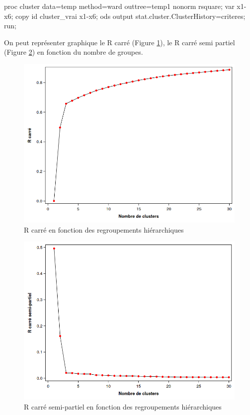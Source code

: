 \documentclass[
  11pt,
  letterpaper,
]{book}
\newenvironment{Shaded}{\begin{snugshade}}{\end{snugshade}}
\newcommand{\NormalTok}[1]{#1}
\theoremstyle{definition}
\theoremstyle{definition}
\theoremstyle{definition}
\theoremstyle{definition}
\theoremstyle{remark}
\begin{document}
\begin{Shaded}
\begin{Highlighting}[]
\NormalTok{proc cluster data=temp method=ward outtree=temp1 nonorm rsquare;}
\NormalTok{var x1{-}x6;}
\NormalTok{copy id cluster\_vrai x1{-}x6;}
\NormalTok{ods output stat.cluster.ClusterHistory=criteres;}
\NormalTok{run;}
\end{Highlighting}
\end{Shaded}

On peut représenter graphique le R carré (Figure \ref{fig:fig4-e7}), le R carré semi partiel (Figure \ref{fig:fig4-e8}) en fonction du nombre de groupes.

\begin{figure}

{\centering \includegraphics[width=0.8\linewidth]{figures/04-clustering-e8} 

}

\caption{R carré en fonction des regroupements hiérarchiques}\label{fig:fig4-e7}
\end{figure}

\begin{figure}

{\centering \includegraphics[width=0.8\linewidth]{figures/04-clustering-e9} 

}

\caption{R carré semi-partiel en fonction des regroupements hiérarchiques}\label{fig:fig4-e8}
\end{figure}
\end{document}
